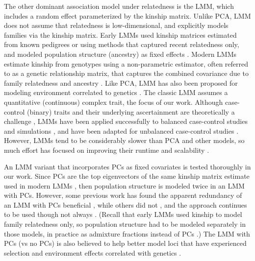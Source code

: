 \documentclass[9pt,lineno]{elife}
\begin{document}
The other dominant association model under relatedness is the LMM, which includes a random effect parameterized by the kinship matrix.
Unlike PCA, LMM does not assume that relatedness is low-dimensional, and explicitly models families via the kinship matrix.
Early LMMs used kinship matrices estimated from known pedigrees or using methods that captured recent relatedness only, and modeled population structure (ancestry) as fixed effects \citep{yu_unified_2006, zhao_arabidopsis_2007, zhu_nonmetric_2009}.
Modern LMMs estimate kinship from genotypes using a non-parametric estimator, often referred to as a genetic relationship matrix, that captures the combined covariance due to family relatedness and ancestry \citep{kang_efficient_2008, astle_population_2009, ochoa_estimating_2021}.
Like PCA, LMM has also been proposed for modeling environment correlated to genetics \citep{vilhjalmsson_nature_2013, wang_trade-offs_2022}.
The classic LMM assumes a quantitative (continuous) complex trait, the focus of our work.
Although case-control (binary) traits and their underlying ascertainment are theoretically a challenge \citep{yang_advantages_2014}, LMMs have been applied successfully to balanced case-control studies \citep{astle_population_2009, kang_variance_2010} and simulations \citep{price_new_2010, wu_comparison_2011, sul_mixed_2013}, and have been adapted for unbalanced case-control studies \citep{zhou_efficiently_2018}.
However, LMMs tend to be considerably slower than PCA and other models, so much effort has focused on improving their runtime and scalability \citep{aulchenko_genomewide_2007, kang_efficient_2008, kang_variance_2010, zhang_mixed_2010, lippert_fast_2011, yang_gcta:_2011, listgarten_improved_2012, zhou_genome-wide_2012, svishcheva_rapid_2012, loh_efficient_2015, zhou_efficiently_2018}.

An LMM variant that incorporates PCs as fixed covariates is tested thoroughly in our work.
Since PCs are the top eigenvectors of the same kinship matrix estimate used in modern LMMs \citep{astle_population_2009, janss_inferences_2012, hoffman_correcting_2013, zhang_principal_2015}, then population structure is modeled twice in an LMM with PCs.
However, some previous work has found the apparent redundancy of an LMM with PCs beneficial \citep{price_new_2010, tucker_improving_2014, zhang_principal_2015}, while others did not \citep{liu_controlling_2011, janss_inferences_2012}, and the approach continues to be used \citep{zeng_signatures_2018, mbatchou_computationally_2021} though not always \citep{matoba_gwas_2020}.
(Recall that early LMMs used kinship to model family relatedness only, so population structure had to be modeled separately in those models, in practice as admixture fractions instead of PCs \citep{yu_unified_2006, zhao_arabidopsis_2007, zhu_nonmetric_2009}.)
The LMM with PCs (vs no PCs) is also believed to help better model loci that have experienced selection \citep{price_new_2010, vilhjalmsson_nature_2013} and environment effects correlated with genetics \citep{zhang_principal_2015}.
\end{document}
